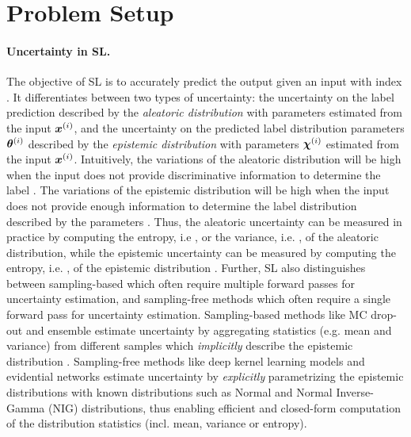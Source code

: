 \vspace{-3mm}
\section{Problem Setup}
\label{sec:setup_011}

\paragraph{Uncertainty in SL.} The objective of SL is to accurately predict the output \smash{$\y\dataix$} given an input \smash{$\x\dataix$} with index \smash{$\idata$}. It differentiates between two types of uncertainty: the uncertainty on the label prediction \smash{$\y\dataix$} described by the \emph{aleatoric distribution} \smash{$\prob(\y\dataix \mid \expparam\dataix)$} with parameters \smash{$\expparam\dataix$} estimated from the input $\x\dataix$, and the uncertainty on the predicted label distribution parameters $\expparam\dataix$ described by the \emph{epistemic distribution} \smash{$\prior(\expparam\dataix \mid \priorparam\dataix)$} with parameters $\priorparam\dataix$ estimated from the input $\x\dataix$. Intuitively, the variations of the aleatoric distribution will be high when the input \smash{$\x\dataix$} does not provide discriminative information to determine the label \smash{$\y\dataix$}. The variations of the epistemic distribution will be high when the input \smash{$\x\dataix$} does not provide enough information to determine the label distribution \smash{$\prior(\expparam\dataix \mid \priorparam\dataix)$} described by the parameters \smash{$\priorparam\dataix$}. Thus, the aleatoric uncertainty can be measured in practice by computing the entropy, i.e , or the variance, i.e. , of the aleatoric distribution, while the epistemic uncertainty can be measured by computing the entropy, i.e. , of the epistemic distribution \cite{priornet, postnet, natpn}. Further, SL also distinguishes between sampling-based which often require multiple forward passes for uncertainty estimation, and sampling-free methods which often require a single forward pass for uncertainty estimation. Sampling-based methods like MC drop-out \cite{dropout} and ensemble \cite{ensembles, hyper-ensembles, batch-ensembles} estimate uncertainty by aggregating statistics (e.g. mean and variance) from different samples which \emph{implicitly} describe the epistemic distribution \smash{$\prior(\expparam\dataix \mid \priorparam\dataix)$}. Sampling-free methods like deep kernel learning models \cite{simple-baseline-uncertainty, due, duq, uceloss} and evidential networks \cite{postnet, priornet, natpn, evidential-regression} estimate uncertainty by \emph{explicitly} parametrizing the epistemic distributions \smash{$\prior(\expparam\dataix) \mid \priorparam\dataix)$} with known distributions such as Normal and Normal Inverse-Gamma (NIG) distributions, thus enabling efficient and closed-form computation of the distribution statistics (incl. mean, variance or entropy).

